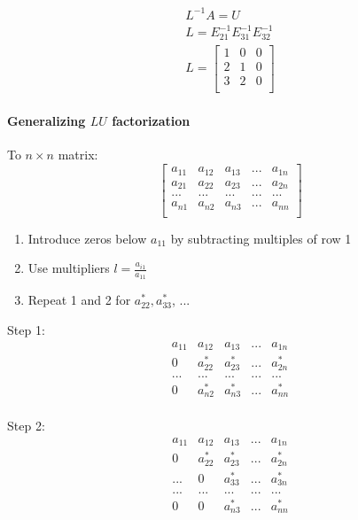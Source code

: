 \documentclass[12pt]{article}
\newcommand{\<}{\langle}
\renewcommand{\>}{\rangle}
\begin{document}
\[
	\begin{matrix}
		L^{-1}A = U \\
		L = E_{21}^{-1} E_{31}^{-1} E_{32}^{-1} \\
		L = \begin{bmatrix}
			1 & 0 & 0 \\
			2 & 1 & 0 \\
			3 & 2 & 0 \\
		\end{bmatrix}
	\end{matrix}
\]

\paragraph{Generalizing $LU$ factorization} To $n \times n$ matrix:
\[
	\begin{bmatrix}
		a_{11} & a_{12} & a_{13} & ... &  a_{1n} \\
		a_{21} & a_{22} & a_{23} & ... &  a_{2n} \\
		... & ... & ... & ... & ...  \\
		a_{n1} & a_{n2} & a_{n3} & ... &  a_{nn} \\
	\end{bmatrix}
\]

\begin{enumerate}
	\item Introduce zeros below $a_{11}$ by subtracting multiples of row 1
	\item Use multipliers $l = \frac{a_{i1}}{a_{11}}$
	\item Repeat 1 and 2 for $a_{22}^*,a_{33}^*$, ...
\end{enumerate}

Step 1:
\[
	\begin{array}{c|cccc}
		a_{11} & a_{12} & a_{13} & ... &  a_{1n} \\\hline
		0 & a_{22}^* & a_{23}^* & ... &  a_{2n}^* \\
		... & ... & ... & ... & ...  \\
		0 & a_{n2}^* & a_{n3}^* & ... &  a_{nn}^* \\
	\end{array}
\]

Step 2:
\[
	\begin{array}{c|c|ccc}
		a_{11} & a_{12} & a_{13} & ... &  a_{1n} \\\hline
		0 & a_{22}^* & a_{23}^* & ... &  a_{2n}^* \\\hline
		... & 0 & a_{33}^* & ... & a_{3n}^* \\
		... & ... & ... & ... & ...  \\
		0 & 0 & a_{n3}^* & ... &  a_{nn}^* \\
	\end{array}
\]
\end{document}
